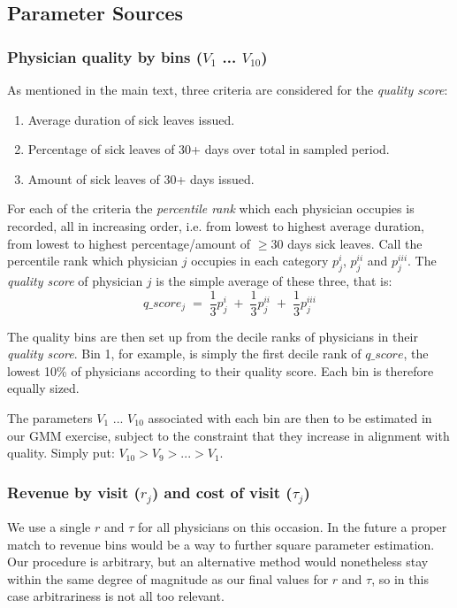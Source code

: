 \documentclass[../main.tex]{subfiles}
\begin{document}
\subsection{Parameter Sources}
\label{sec:par}

\subsubsection*{Physician quality by bins ($V_1$ ... $V_{10}$)}

As mentioned in the main text, three criteria are considered for the \textit{quality score}:
\begin{enumerate}[label=\roman*, itemsep=0pt, topsep=0pt]
    \item Average duration of sick leaves issued.
    \item Percentage of sick leaves of 30+ days over total in sampled period.
    \item Amount of sick leaves of 30+ days issued.
\end{enumerate}

For each of the criteria the \textit{percentile rank} which each physician occupies is recorded, all in increasing order, i.e. from lowest to highest average duration, from lowest to highest percentage/amount of $\geq30$ days sick leaves. Call the percentile rank which physician $j$ occupies in each category $p_j^{i}$, $p_j^{ii}$ and $p_j^{iii}$. The \textit{quality score} of physician $j$ is the simple average of these three, that is:
\[
q\_score_j \;=\; \frac{1}{3}p_j^{i} \;+\; \frac{1}{3}p_j^{ii} \;+\; \frac{1}{3}p_j^{iii}
\]

The quality bins are then set up from the decile ranks of physicians in their \textit{quality score}. Bin 1, for example, is simply the first decile rank of $q\_score$, the lowest 10\% of physicians according to their quality score. Each bin is therefore equally sized.

The parameters $V_1$ ... $V_{10}$ associated with each bin are then to be estimated in our GMM exercise, subject to the constraint that they increase in alignment with quality. Simply put: $ V_{10} > V_{9} > ... > V_{1}$.

\subsubsection*{Revenue by visit ($r_j$) and cost of visit ($\tau_j$)}

We use a single $r$ and $\tau$ for all physicians on this occasion. In the future a proper match to revenue bins would be a way to further square parameter estimation. Our procedure is arbitrary, but an alternative method would nonetheless stay within the same degree of magnitude as our final values for $r$ and $\tau$, so in this case arbitrariness is not all too relevant.
\end{document}
